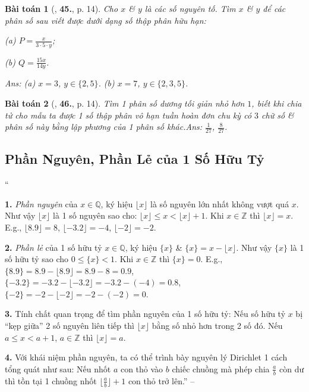 \documentclass{article}
\numberwithin{equation}{section}
\newtheorem{baitoan}{Bài toán}
\begin{document}
\begin{baitoan}[\cite{Tuyen_Toan_7}, \textbf{45.}, p. 14]
	Cho $x$ \& $y$ là các số nguyên tố. Tìm $x$ \& $y$ để các phân số sau viết được dưới dạng số thập phân hữu hạn:
	\begin{enumerate*}
		\item[(a)] $P = \frac{x}{3\cdot 5\cdot y}$;
		\item[(b)] $Q = \frac{15x}{14y}$.
	\end{enumerate*}\hfill\textsf{Ans:} (a) $x = 3$, $y\in\{2,5\}$. (b) $x = 7$, $y\in\{2,3,5\}$.
\end{baitoan}

\begin{baitoan}[\cite{Tuyen_Toan_7}, \textbf{46.}, p. 14]
	Tìm 1 phân số dương tối giản nhỏ hơn $1$, biết khi chia tử cho mẫu ta được 1 số thập phân vô hạn tuần hoàn đơn chu kỳ có $3$ chữ số \& phân số này bằng lập phương của 1 phân số khác.\hfill\textsf{Ans:} $\frac{1}{27}$, $\frac{8}{27}$.
\end{baitoan}


\subsection{Phần Nguyên, Phần Lẻ của 1 Số Hữu Tỷ}
``\begin{enumerate*}
	\item[\textbf{1.}] \textit{Phần nguyên} của $x\in\mathbb{Q}$, ký hiệu $\lfloor x\rfloor$ là số nguyên lớn nhất không vượt quá $x$. Như vậy $\lfloor x\rfloor$ là 1 số nguyên sao cho: $\lfloor x\rfloor\le x < \lfloor x\rfloor + 1$. Khi $x\in\mathbb{Z}$ thì $\lfloor x\rfloor = x$. E.g., $\lfloor 8.9\rfloor = 8$, $\lfloor-3.2\rfloor = -4$, $\lfloor-2\rfloor = -2$.
	\item[\textbf{2.}] \textit{Phần lẻ} của 1 số hữu tỷ $x\in\mathbb{Q}$, ký hiệu $\{x\}$ \& $\{x\} = x - \lfloor x\rfloor$. Như vậy $\{x\}$ là 1 số hữu tỷ sao cho $0\le\{x\} < 1$. Khi $x\in\mathbb{Z}$ thì $\{x\} = 0$. E.g., $\{8.9\} = 8.9 - \lfloor 8.9\rfloor = 8.9 - 8 = 0.9$, $\{-3.2\} = -3.2 - \lfloor-3.2\rfloor = -3.2 -(-4) = 0.8$, $\{-2\} = -2 - \lfloor-2\rfloor = -2 -(-2) = 0$.
	\item[\textbf{3.}] Tính chất quan trọng để tìm phần nguyên của 1 số hữu tỷ: Nếu số hữu tỷ $x$ bị ``kẹp giữa'' 2 số nguyên liên tiếp thì $\lfloor x\rfloor$ bằng số nhỏ hơn trong 2 số đó. Nếu $a\le x < a + 1$, $a\in\mathbb{Z}$ thì $\lfloor x\rfloor = a$.
	\item[\textbf{4.}] Với khái niệm phần nguyên, ta có thể trình bày nguyên lý Dirichlet 1 cách tổng quát như sau: Nếu nhốt $a$ con thỏ vào $b$ chiếc chuồng mà phép chia $\frac{a}{b}$ còn dư thì tồn tại 1 chuồng nhốt $\lfloor\frac{a}{b}\rfloor + 1$ con thỏ trở lên.'' -- \cite[\S6, pp. 14--15]{Tuyen_Toan_7}
\end{enumerate*}
\end{document}
